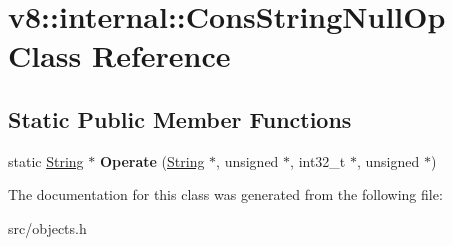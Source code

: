 \hypertarget{classv8_1_1internal_1_1_cons_string_null_op}{}\section{v8\+:\+:internal\+:\+:Cons\+String\+Null\+Op Class Reference}
\label{classv8_1_1internal_1_1_cons_string_null_op}
\subsection*{Static Public Member Functions}
\begin{DoxyCompactItemize}
\item 
\hypertarget{classv8_1_1internal_1_1_cons_string_null_op_a6adc240bf9eed5ce9fb87484982fd852}{}static \hyperlink{classv8_1_1internal_1_1_string}{String} $\ast$ {\bfseries Operate} (\hyperlink{classv8_1_1internal_1_1_string}{String} $\ast$, unsigned $\ast$, int32\+\_\+t $\ast$, unsigned $\ast$)\label{classv8_1_1internal_1_1_cons_string_null_op_a6adc240bf9eed5ce9fb87484982fd852}

\end{DoxyCompactItemize}


The documentation for this class was generated from the following file\+:\begin{DoxyCompactItemize}
\item 
src/objects.\+h\end{DoxyCompactItemize}
